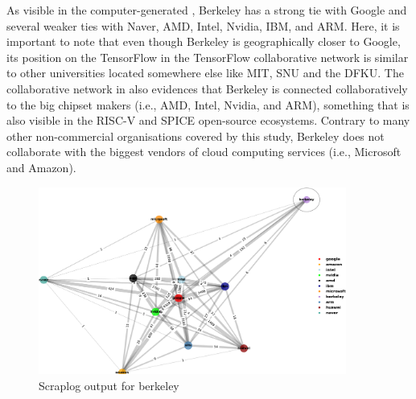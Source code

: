 \documentclass[CHICAGO,Times1COL]{WileyNJDv5} %
\begin{document}
As visible in the computer-generated , Berkeley has a strong tie with Google and several weaker ties with Naver, AMD, Intel, Nvidia, IBM, and ARM. Here, it is important to note that even though Berkeley is geographically closer to Google, its position on the TensorFlow in the TensorFlow collaborative network is similar to other universities located somewhere else like MIT, SNU and the DFKU. The collaborative network in  also evidences that Berkeley is connected collaboratively to the big chipset makers (i.e., AMD, Intel, Nvidia, and ARM), something that is also visible in the RISC-V and SPICE open-source ecosystems.  Contrary to many other non-commercial organisations covered by this study, Berkeley does not collaborate with the biggest vendors of cloud computing services (i.e., Microsoft and Amazon). 










\begin{figure}[h]
\centering
\includegraphics[keepaspectratio=true,width=0.9\textwidth]{./Figures/noo/berkeley_cropped.pdf}
\caption{Scraplog output for berkeley}
\label{figberkeley}
\end{figure}
\end{document}
